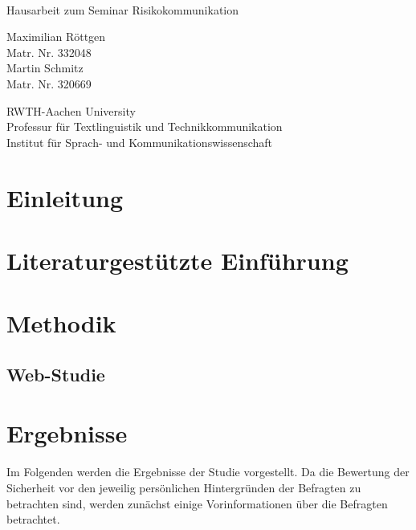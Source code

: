 \documentclass[fontsize=13pt,a4paper]{article}
\begin{document}
\thispagestyle{empty}

{%
 \centering
 \Large

 ~\vspace{\fill}

 {\huge
  Hausarbeit zum Seminar Risikokommunikation}

 \vspace{2.5cm}

 {\Large
  Maximilian Röttgen
 }\\
 Matr. Nr. 332048\\
 {\Large
  Martin Schmitz
}\\
Matr. Nr. 320669

 \vspace{3.5cm}

 RWTH-Aachen University\\
 Professur für Textlinguistik und Technikkommunikation\\
 Institut für Sprach- und Kommunikationswissenschaft

 \vspace{3.5cm}

\vspace{\fill}


}%
\clearpage

\tableofcontents
\clearpage

\section{Einleitung}

\section{Literaturgestützte Einführung}

\section{Methodik}
\subsection{Web-Studie}

\section{Ergebnisse}
Im Folgenden werden die Ergebnisse der Studie vorgestellt. Da die Bewertung der Sicherheit vor den jeweilig persönlichen Hintergründen der Befragten zu betrachten sind, werden zunächst einige Vorinformationen über die Befragten betrachtet.
\end{document}
